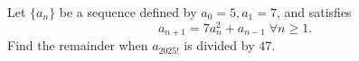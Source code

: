Let $\{a_n\}$ be a sequence defined by $a_0=5,a_1=7$, and satisfies \[a_{n+1} = 7a_n^2 + a_{n-1} \; \forall n \geq 1.\]Find the remainder when $a_{2025!}$ is divided by $47$.
